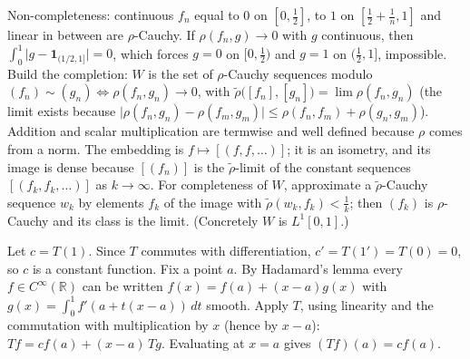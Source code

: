 \documentclass[11pt,a4paper]{article}
\begin{document}
Non-completeness: continuous \(f_n\) equal to \(0\) on \([0,\frac12]\), to \(1\) on \([\frac12+\frac1n,1]\) and linear in between are \(\rho\)-Cauchy. If \(\rho(f_n,g)\to0\) with \(g\) continuous, then \(\int_0^1\lvert g-\mathbf 1_{(1/2,1]}\rvert=0\), which forces \(g=0\) on \([0,\frac12)\) and \(g=1\) on \((\frac12,1]\), impossible.
Build the completion: \(W\) is the set of \(\rho\)-Cauchy sequences modulo \((f_n)\sim(g_n)\iff\rho(f_n,g_n)\to0\), with \(\tilde\rho\bigl([f_n],[g_n]\bigr)=\lim\rho(f_n,g_n)\) (the limit exists because \(\lvert\rho(f_n,g_n)-\rho(f_m,g_m)\rvert\le\rho(f_n,f_m)+\rho(g_n,g_m)\)). Addition and scalar multiplication are termwise and well defined because \(\rho\) comes from a norm.
The embedding is \(f\mapsto[(f,f,\dots)]\); it is an isometry, and its image is dense because \([(f_n)]\) is the \(\tilde\rho\)-limit of the constant sequences \([(f_k,f_k,\dots)]\) as \(k\to\infty\). For completeness of \(W\), approximate a \(\tilde\rho\)-Cauchy sequence \(w_k\) by elements \(f_k\) of the image with \(\tilde\rho(w_k,f_k)\lt\frac1k\); then \((f_k)\) is \(\rho\)-Cauchy and its class is the limit. (Concretely \(W\) is \(L^1[0,1]\).)

Let \(c=T(1)\). Since \(T\) commutes with differentiation, \(c'=T(1')=T(0)=0\), so \(c\) is a constant function.
Fix a point \(a\). By Hadamard's lemma every \(f\in C^\infty(\mathbb R)\) can be written \(f(x)=f(a)+(x-a)g(x)\) with \(g(x)=\int_0^1f'(a+t(x-a))\,dt\) smooth. Apply \(T\), using linearity and the commutation with multiplication by \(x\) (hence by \(x-a\)): \(Tf=cf(a)+(x-a)\,Tg\). Evaluating at \(x=a\) gives \((Tf)(a)=cf(a)\).
\end{document}
